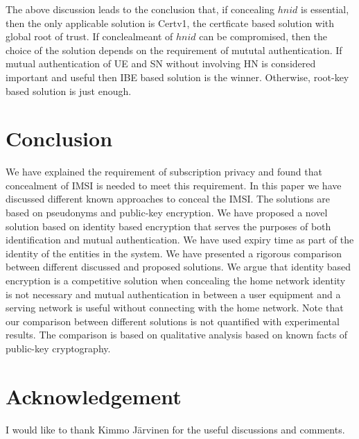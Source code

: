 \documentclass[runningheads,a4paper]{llncs} %
\begin{document}
The above discussion leads to the conclusion that, if concealing $hnid$ is essential, then the only applicable solution is Certv1, the certficate based solution with global root of trust. If conclealmeant of $hnid$ can be compromised, then the choice  of the solution depends on the requirement of mututal authentication. If mutual authentication of UE and SN without involving HN is considered important and useful then IBE based solution is the winner. Otherwise, root-key based solution is just enough.


\section{Conclusion}
\label{sec:conclusion}
We have explained the requirement of subscription privacy and found that concealment of IMSI is needed to meet this requirement. In this paper we have discussed different known approaches to conceal the IMSI. The solutions  are based on pseudonyms and public-key encryption. We have proposed a novel solution based on identity based encryption that serves the purposes of both identification and mutual authentication. We have used expiry time as part of the identity of the entities in the system. We have presented a rigorous comparison between different discussed and proposed solutions. We argue that identity based encryption is a competitive solution when concealing the home network identity is not necessary and mutual authentication in between a user equipment and a serving network is useful without connecting with the home network. Note that our comparison between different solutions is not quantified with experimental results. The comparison is based on qualitative analysis based on known facts of public-key cryptography. 

\section{Acknowledgement}
\label{sec:acknowledgement}
I would like to thank Kimmo J\"arvinen for the useful discussions and comments.
\end{document}
